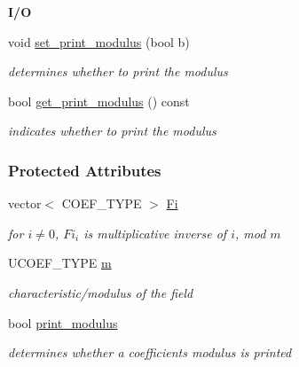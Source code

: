 \begin{Indent}\textbf{ I/O}\par
\begin{DoxyCompactItemize}
\item 
\mbox{\label{group___fields_group_a1ff3ec98ffb33a35c51eb3ce99ae7ebd}} 
void \hyperlink{group___fields_group_a1ff3ec98ffb33a35c51eb3ce99ae7ebd}{set\+\_\+print\+\_\+modulus} (bool b)
\begin{DoxyCompactList}\small\item\em determines whether to print the modulus \end{DoxyCompactList}\item 
\mbox{\label{group___fields_group_a5ac5cf31e741cc6d250176163bde658c}} 
bool \hyperlink{group___fields_group_a5ac5cf31e741cc6d250176163bde658c}{get\+\_\+print\+\_\+modulus} () const
\begin{DoxyCompactList}\small\item\em indicates whether to print the modulus \end{DoxyCompactList}\end{DoxyCompactItemize}
\end{Indent}
\subsubsection*{Protected Attributes}
\begin{DoxyCompactItemize}
\item 
\mbox{\label{group___fields_group_acbcc0858cd26489bd5837d491788a734}} 
vector$<$ C\+O\+E\+F\+\_\+\+T\+Y\+PE $>$ \hyperlink{group___fields_group_acbcc0858cd26489bd5837d491788a734}{Fi}
\begin{DoxyCompactList}\small\item\em for $i\neq0$, $Fi_i$ is multiplicative inverse of $i$, mod $m$ \end{DoxyCompactList}\item 
\mbox{\label{group___fields_group_a0fa882a2952f67bf7e071b6f491d6075}} 
U\+C\+O\+E\+F\+\_\+\+T\+Y\+PE \hyperlink{group___fields_group_a0fa882a2952f67bf7e071b6f491d6075}{m}
\begin{DoxyCompactList}\small\item\em characteristic/modulus of the field \end{DoxyCompactList}\item 
\mbox{\label{group___fields_group_ab9ea57c2214d84d29908b445423bb57b}} 
bool \hyperlink{group___fields_group_ab9ea57c2214d84d29908b445423bb57b}{print\+\_\+modulus}
\begin{DoxyCompactList}\small\item\em determines whether a coefficient\textquotesingle{}s modulus is printed \end{DoxyCompactList}\end{DoxyCompactItemize}


